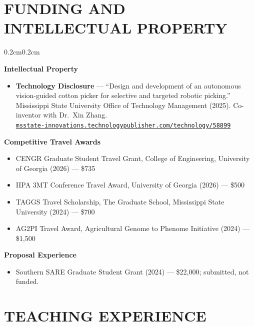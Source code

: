 \documentclass[10pt, letterpaper]{article}
\newenvironment{highlights}{%
    \begin{itemize}[topsep=0.08cm, parsep=0.08cm, partopsep=0pt,
                    itemsep=0pt, leftmargin=0.4cm + 10pt]
}{\end{itemize}}
\newenvironment{onecolentry}{%
    \begin{adjustwidth}{0.2cm}{0.2cm}
}{\end{adjustwidth}}
\begin{document}
\section{FUNDING AND INTELLECTUAL PROPERTY}
\vspace{0.08cm}
\begin{onecolentry}
    \textbf{Intellectual Property}
    \begin{highlights}
        \item \textbf{Technology Disclosure} --- ``Design and development of an
              autonomous vision-guided cotton picker for selective and targeted
              robotic picking.'' Mississippi State University Office of Technology
              Management (2025). Co-inventor with Dr.\ Xin Zhang.
              \\ \href{https://msstate-innovations.technologypublisher.com/technology/58899}{\texttt{msstate-innovations.technologypublisher.com/technology/58899}}
    \end{highlights}
    \vspace{0.10cm}
    \textbf{Competitive Travel Awards}
    \begin{highlights}
        \item CENGR Graduate Student Travel Grant, College of Engineering,
              University of Georgia (2026) --- \$735
        \item IIPA 3MT Conference Travel Award, University of Georgia (2026) --- \$500
        \item TAGGS Travel Scholarship, The Graduate School, Mississippi State
              University (2024) --- \$700
        \item AG2PI Travel Award, Agricultural Genome to Phenome Initiative
              (2024) --- \$1{,}500
    \end{highlights}
    \vspace{0.10cm}
    \textbf{Proposal Experience}
    \begin{highlights}
        \item Southern SARE Graduate Student Grant (2024) --- \$22{,}000;
              submitted, not funded.
    \end{highlights}
\end{onecolentry}
\vspace{0.10cm}

\section{TEACHING EXPERIENCE}
\vspace{0.08cm}
\end{document}
